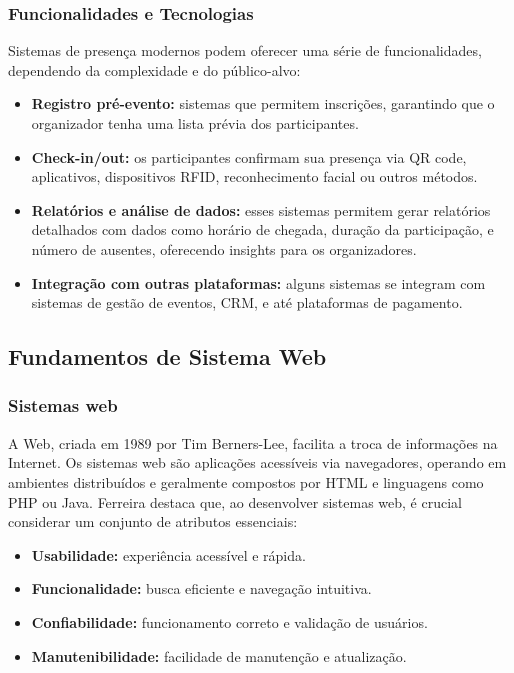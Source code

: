 \subsubsection{Funcionalidades e Tecnologias}
Sistemas de presença modernos podem oferecer uma série de funcionalidades, dependendo da complexidade e do público-alvo:

\begin{itemize}
    \item \textbf{Registro pré-evento:} sistemas que permitem inscrições, garantindo que o organizador tenha uma lista prévia dos participantes.
    \item \textbf{Check-in/out:} os participantes confirmam sua presença via QR code, aplicativos, dispositivos RFID, reconhecimento facial ou outros métodos.
    \item \textbf{Relatórios e análise de dados:} esses sistemas permitem gerar relatórios detalhados com dados como horário de chegada, duração da participação, e número de ausentes, oferecendo insights para os organizadores.
    \item \textbf{Integração com outras plataformas:} alguns sistemas se integram com sistemas de gestão de eventos, CRM, e até plataformas de pagamento.
\end{itemize}

\subsection{Fundamentos de Sistema Web}

\subsubsection{Sistemas web}
A Web, criada em 1989 por Tim Berners-Lee, facilita a troca de informações na Internet. Os sistemas web são aplicações acessíveis via navegadores, operando em ambientes distribuídos e geralmente compostos por HTML e linguagens como PHP ou Java. 
Ferreira \cite{ferreira2023} destaca que, ao desenvolver sistemas web, é crucial considerar um conjunto de atributos essenciais:

\begin{itemize}
    \item \textbf{Usabilidade:} experiência acessível e rápida.
    \item \textbf{Funcionalidade:} busca eficiente e navegação intuitiva.
    \item \textbf{Confiabilidade:} funcionamento correto e validação de usuários.
    \item \textbf{Manutenibilidade:} facilidade de manutenção e atualização.
\end{itemize}

